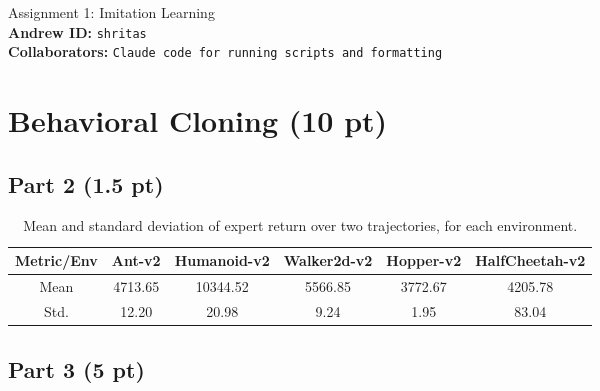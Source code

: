 \documentclass{article}
\begin{document}
\begin{center}
    {\Large Assignment 1: Imitation Learning} \\
    \vspace{.25cm}
    \textbf{Andrew ID:} \texttt{shritas} \\
    \textbf{Collaborators:} \texttt{Claude code for running scripts and formatting}
\end{center}


\section{Behavioral Cloning (10 pt)}

\subsection{Part 2 (1.5 pt)}
\begin{table}[!h]
  \centering
  \caption{Mean and standard deviation of expert return over two trajectories, for each environment.}
  \begin{tabular}{cccccc}
    \toprule
    Metric/Env & Ant-v2 & Humanoid-v2 & Walker2d-v2 & Hopper-v2 & HalfCheetah-v2 \\
    \midrule
    Mean  & 4713.65 & 10344.52 & 5566.85 & 3772.67 & 4205.78 \\
    Std.  & 12.20 & 20.98 & 9.24 & 1.95 & 83.04 \\
    \bottomrule
  \end{tabular}
  \label{tab:p2}
\end{table}

\subsection{Part 3 (5 pt)}
\end{document}
